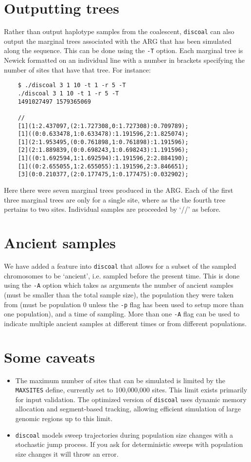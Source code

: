 \documentclass[12pt]{article}
\begin{document}
\section*{Outputting trees}
Rather than output haplotype samples from the coalescent, \texttt{discoal} can also output the marginal trees associated with the ARG that has been simulated along the sequence. This can be done using the \texttt{-T} option. Each marginal tree is Newick formatted on an individual line with a number in brackets specifying the number of sites that have that tree. For instance:
\begin{verbatim}
	$ ./discoal 3 1 10 -t 1 -r 5 -T
	./discoal 3 1 10 -t 1 -r 5 -T
	1491027497 1579365069

	//
	[1](1:2.437097,(2:1.727308,0:1.727308):0.709789);
	[1]((0:0.633478,1:0.633478):1.191596,2:1.825074);
	[1](2:1.953495,(0:0.761898,1:0.761898):1.191596);
	[2](2:1.889839,(0:0.698243,1:0.698243):1.191596);
	[1]((0:1.692594,1:1.692594):1.191596,2:2.884190);
	[1]((0:2.655055,1:2.655055):1.191596,2:3.846651);
	[3](0:0.210377,(2:0.177475,1:0.177475):0.032902);
\end{verbatim}
Here there were seven marginal trees produced in the ARG. Each of the first three marginal trees are only for a single site, where as the the fourth tree pertains to two sites. Individual samples are proceeded by `//' as before.

\section*{Ancient samples}
We have added a feature into \texttt{discoal} that allows for a subset of the sampled chromosomes to be `ancient', i.e. sampled before the present time. This is done using the \texttt{-A} option which takes as arguments the number of ancient samples (must be smaller than the total sample size), the population they were taken from (must be population 0 unless the \texttt{-p} flag has been used to setup more than one population), and a time of sampling. More than one \texttt{-A} flag can be used to indicate multiple ancient samples at different times or from different populations. 

\section*{Some caveats}

\begin{itemize}

	\item The maximum number of sites that can be simulated is limited by the \texttt{MAXSITES} define, currently set to 100,000,000 sites. This limit exists primarily for input validation. The optimized version of \texttt{discoal} uses dynamic memory allocation and segment-based tracking, allowing efficient simulation of large genomic regions up to this limit. 


	\item \texttt{discoal} models sweep trajectories during population size changes with a stochastic jump process. If you ask for deterministic sweeps with population size changes it will throw an error.

\end{itemize}
\end{document}
